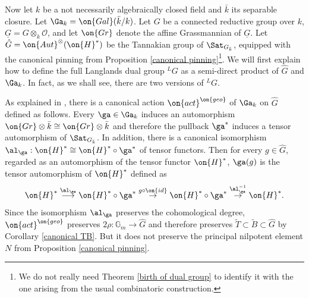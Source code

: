 \documentclass[]{pcmi}
\theoremstyle{plain}
\theoremstyle{remark}
\theoremstyle{definition}
\newcommand{\bG}{{\mathbb G}}
\newcommand{\mO}{{\mathcal O}}
\newcommand{\Aut}{{\on{Aut}}}
\newcommand{\Gal}{{\on{Gal}}}
\newcommand{\Gr}{{\on{Gr}}}
\newcommand{\id}{{\on{id}}}
\begin{document}
Now let $k$ be a not necessarily algebraically closed field and $\bar k$ its separable closure. Let $\Ga_k=\Gal(\bar k/k)$.
Let $G$ be a connected reductive group over $k$, $\underline G=G\otimes_k\mO$, and let $\Gr$ denote the affine Grassmannian of $\underline G$. 
Let $\hat G=\Aut^{\otimes}(\on{H}^*)$ be the Tannakian group of $\Sat_{G_{\bar k}}$, equipped with the canonical pinning from Proposition \ref{canonical pinning}\footnote{We do not really need Theorem \ref{birth of dual group} to identify it with the one arising from the usual combinatoric construction.}. We will first explain how to define the full Langlands dual group ${^L}G$ as a semi-direct product of $\hat G$ and $\Ga_k$. In fact, as we shall see, there are two versions of ${^L}G$.

As explained in \cite{RZ}, there is a canonical action $\on{act}^{\on{geo}}$ of $\Ga_k$ on $\hat G$ defined as follows. Every $\ga\in \Ga_k$ induces an automorphism $\Gr\otimes \bar k\cong \Gr\otimes \bar k$ and therefore the pullback $\ga^*$ induces a tensor automorphism of $\Sat_{G_{\bar k}}$.  In addition, there is a canonical isomorphism 
$\al_\ga: \on{H}^*\cong \on{H}^*\circ \ga^*$
of tensor functors. 
Then for every $g\in \hat G$, regarded as an automorphism of the tensor functor $\on{H}^*$, $\ga(g)$ is the tensor automorphism of $\on{H}^*$ defined as
\begin{equation}\label{gaaction}
\on{H}^*\stackrel{\al_\ga}{\longrightarrow}\on{H}^*\circ\ga^*\stackrel{g\circ \id}{\to}\on{H}^*\circ\ga^*\stackrel{\al^{-1}_\ga}{\to}\on{H}^*.
\end{equation}
Since the isomorphism $\al_\ga$ preserves the cohomological degree,  $\on{act}^{\on{geo}}$ preserves $2\rho:\bG_m\to \hat G$ and therefore preserves
$\tilde T\subset \tilde B\subset \hat G$ by Corollary \ref{canonical TB}. But it does not preserve the principal nilpotent element $N$ from Proposition \ref{canonical pinning}. 
\end{document}
